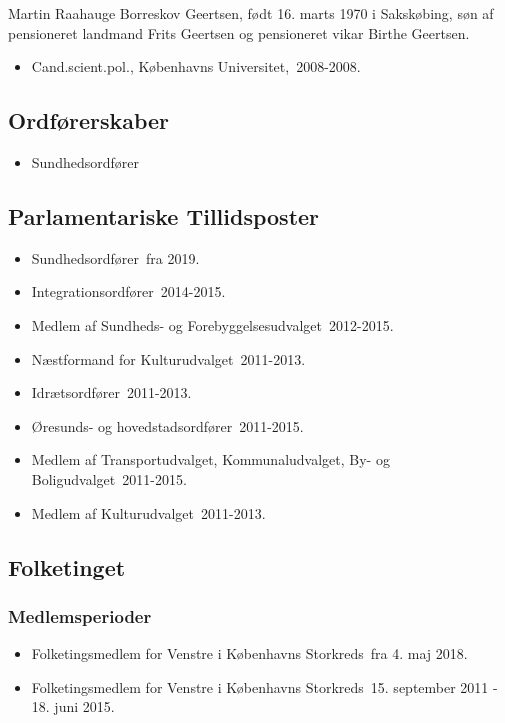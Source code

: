 \documentclass[11pt, a4paper]{awesome-cv}
\begin{document}
\makecvheader[R]
\makelettertitle
\begin{cvletter}
Martin Raahauge Borreskov Geertsen, født 16. marts 1970 i Sakskøbing, søn af pensioneret landmand Frits Geertsen og pensioneret vikar Birthe Geertsen.

\begin{itemize}
\item Cand.scient.pol., Københavns Universitet, 2008-2008.
\end{itemize}
\subsection*{Ordførerskaber}
\begin{itemize}
\item Sundhedsordfører
\end{itemize}
\subsection*{Parlamentariske Tillidsposter}
\begin{itemize}
\item Sundhedsordfører fra 2019.
\item Integrationsordfører 2014-2015.
\item Medlem af Sundheds- og Forebyggelsesudvalget 2012-2015.
\item Næstformand for Kulturudvalget 2011-2013.
\item Idrætsordfører 2011-2013.
\item Øresunds- og hovedstadsordfører 2011-2015.
\item Medlem af Transportudvalget, Kommunaludvalget, By- og Boligudvalget 2011-2015.
\item Medlem af Kulturudvalget 2011-2013.
\end{itemize}
\subsection*{Folketinget}
\subsubsection*{Medlemsperioder}
\begin{itemize}
\item Folketingsmedlem for Venstre i Københavns Storkreds fra 4. maj 2018.
\item Folketingsmedlem for Venstre i Københavns Storkreds 15. september 2011 - 18. juni 2015.
\end{itemize}

\end{cvletter}
\end{document}
